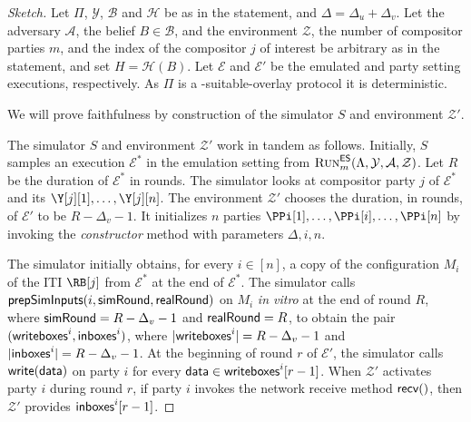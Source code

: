 \begin{proof}[Sketch]
  Let $\Pi$, $\mathcal{Y}$, $\mathcal{B}$ and $\mathcal{H}$
  be as in the statement, and $\Delta = \Delta_u + \Delta_v$.
  Let the adversary $\mathcal{A}$, the belief $B \in \mathcal{B}$,
  and the environment $\mathcal{Z}$, the number of compositor parties $m$,
  and the index of the compositor $j$ of interest be arbitrary
  as in the statement, and set $H = \mathcal{H}(B)$.
  Let $\mathcal{E}$ and $\mathcal{E}'$ be the emulated and party setting
  executions, respectively.
  As $\Pi$ is a \rollerblade-suitable-overlay protocol it is deterministic.

  We will prove faithfulness by
  construction of the simulator $S$ and environment $\mathcal{Z}'$.

  The simulator $S$ and environment $\mathcal{Z}'$ work in tandem
  as follows.
  Initially, $S$ samples an execution
  $\mathcal{E}^*$ in the emulation setting from
  $\textsc{Run}^{\textsf{ES}}_m(\Lambda,\allowbreak\mathcal{Y},\allowbreak\mathcal{A},\allowbreak\mathcal{Z})$.
  Let $R$ be the duration of $\mathcal{E}^*$ in rounds.
  The simulator looks at compositor party $j$ of $\mathcal{E}^*$
  and its $\Y[j][1], \ldots, \Y[j][n]$.
  The environment $\mathcal{Z}'$ chooses the duration, in rounds, of
  $\mathcal{E}'$ to be $R - \Delta_v - 1$. It initializes $n$
  parties $\PPi[1], \ldots, \PPi[i], \ldots, \PPi[n]$ by invoking
  the \emph{constructor} method with parameters $\Delta, i, n$.

  The simulator initially obtains, for every $i \in [n]$,
  a copy of the configuration $M_i$ of the ITI $\RB[j]$ from $\mathcal{E}^*$ at the end of
  $\mathcal{E}^*$.
  The simulator calls $\textsf{prepSimInputs}(i, \textsf{simRound}, \textsf{realRound})$ on $M_i$
  \emph{in vitro} at the end of round $R$, where $\textsf{simRound} = R - \Delta_v - 1$
  and $\textsf{realRound} = R$, to obtain the pair
  $(\textsf{writeboxes}^i, \textsf{inboxes}^i)$, where
  $|\textsf{writeboxes}^i| = R - \Delta_v - 1$
  and
  $|\textsf{inboxes}^i| = R - \Delta_v - 1$.
  At the beginning of round $r$ of $\mathcal{E}'$, the simulator calls
  $\textsf{write}(\textsf{data})$ on party $i$
  for every $\textsf{data} \in \textsf{writeboxes}^i[r - 1]$.
  When $\mathcal{Z}'$ activates party $i$ during round $r$,
  if party $i$ invokes the network receive method $\textsf{recv}()$, then $\mathcal{Z}'$
  provides $\textsf{inboxes}^i[r - 1]$.



\end{proof}
